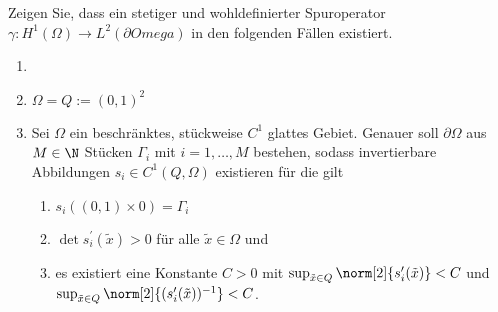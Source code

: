 
\begin{exercise}
Zeigen Sie, dass ein stetiger und wohldefinierter Spuroperator $\gamma: H^1(\Omega) \rightarrow L^2(\partial Omega)$
in den folgenden Fällen existiert.

\begin{enumerate}[label = \textbf{\alph*)}]\item
  \item $\Omega = Q:=(0,1)^2$
  \item Sei $\Omega$ ein beschränktes, stückweise $C^1$ glattes Gebiet. Genauer soll
  $\partial \Omega$ aus $M \in \N$ Stücken $\Gamma_i$ mit $i = 1,\dots,M$ bestehen,
  sodass invertierbare Abbildungen $s_i \in C^1(Q,\Omega)$ existieren für die gilt
  \begin{enumerate}[label = (\alph*)]
    \item $s_i((0,1) \times {0}) = \Gamma_i$
    \item $\det s_i^\prime (\tilde{x}) > 0$ für alle $\tilde{x} \in \Omega$ und
    \item es existiert eine Konstante $C > 0$ mit $\sup_{\tilde{x} \in Q}\norm[2]{s_i^\prime (\tilde{x})} < C$ und
    $\sup_{\tilde{x} \in Q}\norm[2]{(s_i^\prime (\tilde{x}))^{-1}} < C$.
  \end{enumerate}
\end{enumerate}
\end{exercise}


\begin{solution}

\end{solution}

